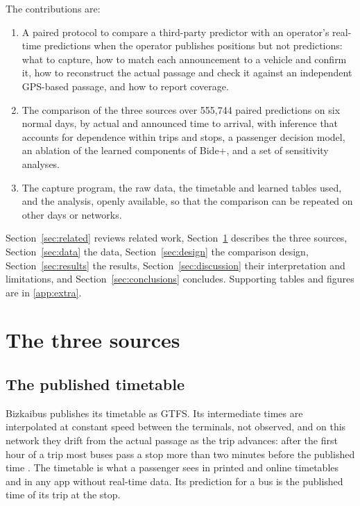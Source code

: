 The contributions are:
\begin{enumerate}
  \item A paired protocol to compare a third-party predictor with an operator's real-time predictions when the operator
        publishes positions but not predictions: what to capture, how to match each announcement to a vehicle and confirm
        it, how to reconstruct the actual passage and check it against an independent GPS-based passage, and how to report
        coverage.
  \item The comparison of the three sources over 555,744 paired predictions on six normal days, by actual and announced
        time to arrival, with inference that accounts for dependence within trips and stops, a passenger decision model, an
        ablation of the learned components of Bide+, and a set of sensitivity analyses.
  \item The capture program, the raw data, the timetable and learned tables used, and the analysis, openly available, so
        that the comparison can be repeated on other days or networks.
\end{enumerate}

Section~\ref{sec:related} reviews related work, Section~\ref{sec:predictors} describes the three sources,
Section~\ref{sec:data} the data, Section~\ref{sec:design} the comparison design, Section~\ref{sec:results} the results,
Section~\ref{sec:discussion} their interpretation and limitations, and Section~\ref{sec:conclusions} concludes.
Supporting tables and figures are in \ref{app:extra}.



\section{The three sources}
\label{sec:predictors}

\subsection{The published timetable}

Bizkaibus publishes its timetable as GTFS. Its intermediate times are interpolated at constant speed between the
terminals, not observed, and on this network they drift from the actual passage as the trip advances: after the first
hour of a trip most buses pass a stop more than two minutes before the published time \parencite{garrido2026metodo}. The
timetable is what a passenger sees in printed and online timetables and in any app without real-time data. Its prediction
for a bus is the published time of its trip at the stop.

